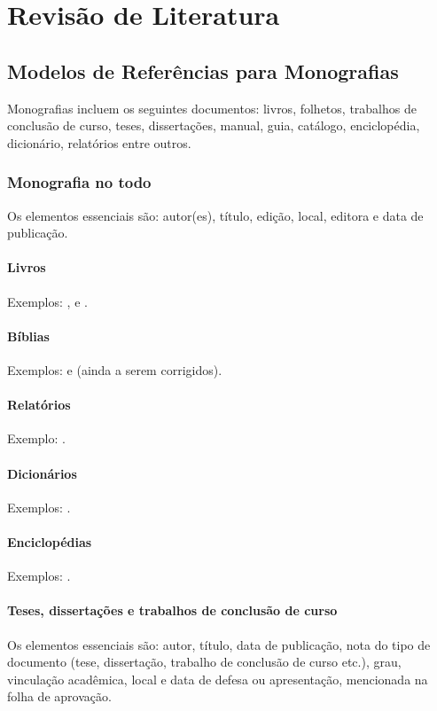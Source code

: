 \documentclass[monografia]{subfiles}
\begin{document}
	\chapter{Revisão de Literatura}

	\section{Modelos de Referências para Monografias}
	Monografias incluem os seguintes documentos: livros, folhetos,
trabalhos de conclusão de curso, teses, dissertações, manual, guia,
catálogo, enciclopédia, dicionário, relatórios entre outros.

	\subsection{Monografia no todo}
	Os elementos essenciais são: autor(es), título, edição, local,
editora e data de publicação.

	\subsubsection{Livros}
	Exemplos: \cite{livro01}, \cite{livro02} e \cite{livro03}.

	\subsubsection{Bíblias}
	Exemplos: \cite{biblia01} e \cite{biblia02} (ainda
	a serem corrigidos).

	\subsubsection{Relatórios}
	Exemplo: \cite{relatorio01}.

	\subsubsection{Dicionários}
	Exemplos: \cite{dicionario01}.

	\subsubsection{Enciclopédias}
	Exemplos: \cite{enciclopedia01}.

	\subsubsection{Teses, dissertações e trabalhos de conclusão de curso}
	Os elementos essenciais são: autor, título, data de publicação,
nota do tipo de documento (tese, dissertação, trabalho de conclusão de
curso etc.), grau, vinculação acadêmica, local e data de defesa ou
apresentação, mencionada na folha de aprovação.
\end{document}

